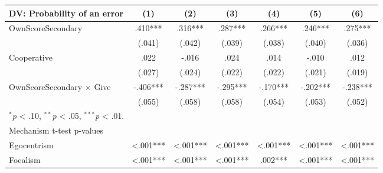 \begingroup
\centering
\begin{tabular*}{\linewidth}{@{\extracolsep{\fill}}lcccccc}
   \toprule
   DV: Probability of an error & \multicolumn{1}{c}{(1)} & \multicolumn{1}{c}{(2)} & \multicolumn{1}{c}{(3)} & \multicolumn{1}{c}{(4)} & \multicolumn{1}{c}{(5)} & \multicolumn{1}{c}{(6)}\\
   \midrule
   OwnScoreSecondary & \mbox{\hphantom{8}.410***} & \mbox{\hphantom{8}.316***} & \mbox{\hphantom{8}.287***} & \mbox{\hphantom{8}.266***} & \mbox{\hphantom{8}.246***} & \mbox{\hphantom{8}.275***}\\
    & \mbox{(.041)\hphantom{88}} & \mbox{(.042)\hphantom{88}} & \mbox{(.039)\hphantom{88}} & \mbox{(.038)\hphantom{88}} & \mbox{(.040)\hphantom{88}} & \mbox{(.036)\hphantom{88}}\\
   Cooperative & \mbox{\hphantom{8}.022\hphantom{888}} & \mbox{-.016\hphantom{888}} & \mbox{\hphantom{8}.024\hphantom{888}} & \mbox{\hphantom{8}.014\hphantom{888}} & \mbox{-.010\hphantom{888}} & \mbox{\hphantom{8}.012\hphantom{888}}\\
    & \mbox{(.027)\hphantom{88}} & \mbox{(.024)\hphantom{88}} & \mbox{(.022)\hphantom{88}} & \mbox{(.022)\hphantom{88}} & \mbox{(.021)\hphantom{88}} & \mbox{(.019)\hphantom{88}}\\
   OwnScoreSecondary $\times$ Give & \mbox{-.406***} & \mbox{-.287***} & \mbox{-.295***} & \mbox{-.170***} & \mbox{-.202***} & \mbox{-.238***}\\
    & \mbox{(.055)\hphantom{88}} & \mbox{(.058)\hphantom{88}} & \mbox{(.058)\hphantom{88}} & \mbox{(.054)\hphantom{88}} & \mbox{(.053)\hphantom{88}} & \mbox{(.052)\hphantom{88}}\\
   \multicolumn{7}{l}{\scriptsize $^{*}$\textit{p} < .10, $^{**}$\textit{p} < .05, $^{***}$\textit{p} < .01.}\\
   \midrule
   Mechanism t-test p-values &  &  &  &  &  & \\
   \hspace{1em}Egocentrism & \mbox{<.001***} & \mbox{<.001***} & \mbox{<.001***} & \mbox{<.001***} & \mbox{<.001***} & \mbox{<.001***}\\
   \hspace{1em}Focalism & \mbox{<.001***} & \mbox{<.001***} & \mbox{<.001***} & \mbox{\hphantom{8}.002***} & \mbox{<.001***} & \mbox{<.001***}\\
   \bottomrule
\end{tabular*}
\par\endgroup
